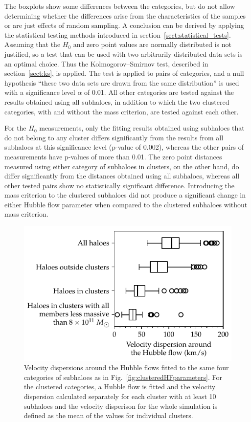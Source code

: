 \documentclass[english, twoside]{HYgradu}
\begin{document}
The boxplots show some differences between the categories, but do not allow determining whether the differences arise from the characteristics of the samples or are just effects of random sampling. A conclusion can be derived by applying the statistical testing methods introduced in section~\ref{sect:statistical_tests}. Assuming that the $H_0$ and zero point values are normally distributed is not justified, so a test that can be used with two arbitrarily distributed data sets is an optimal choice. Thus the Kolmogorov--Smirnov test, described in section~\ref{sect:ks}, is applied. The test is applied to pairs of categories, and a null hypothesis ``these two data sets are drawn from the same distribution'' is used with a significance level $\alpha$ of 0.01. All other categories are tested against the results obtained using all subhaloes, in addition to which the two clustered categories, with and without the mass criterion, are tested against each other.

For the $H_0$ measurements, only the fitting results obtained using subhaloes that do not belong to any cluster differs significantly from the results from all subhaloes at this significance level (p-value of 0.002), whereas the other pairs of measurements have p-values of more than 0.01. The zero point distances measured using either category of subhaloes in clusters, on the other hand, do differ significantly from the distances obtained using all subhaloes, whereas all other tested pairs show no statistically significant difference. Introducing the mass criterion to the clustered subhaloes did not produce a significant change in either Hubble flow parameter when compared to the clustered subhaloes without mass criterion.

\begin{figure}
    \centering
    \includegraphics{kuvat/clusteredHFdispersions.pdf}
    \caption{Velocity dispersions around the Hubble flows fitted to the same four categories of subhaloes as in Fig.~\ref{fig:clusteredHFparameters}. For the clustered categories, a Hubble flow is fitted and the velocity dispersion calculated separately for each cluster with at least 10 subhaloes and the velocity disperison for the whole simulation is defined as the mean of the values for individual clusters.}\label{fig:clusteredHFdispersions}
\end{figure}
\end{document}
